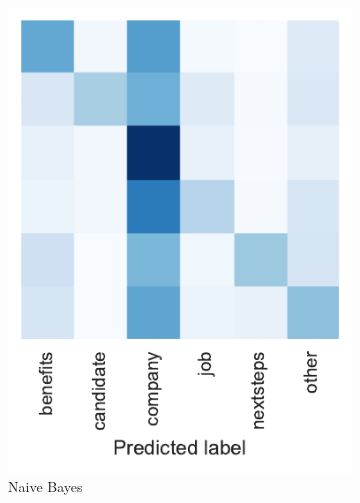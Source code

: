 \begin{figure}[h]
\begin{subfigure}[b]{0.27\textwidth}
        \includegraphics[width=\textwidth]{img/exp-vector-space/bom-conf-matrix-naivebayes-normalized.pdf}
        \caption{Naive Bayes}
\label{fig:bom-conf-matrix-naivebayes-normalized}
    \end{subfigure}
    \begin{subfigure}[b]{0.345\textwidth}

\end{subfigure}
\end{figure}
